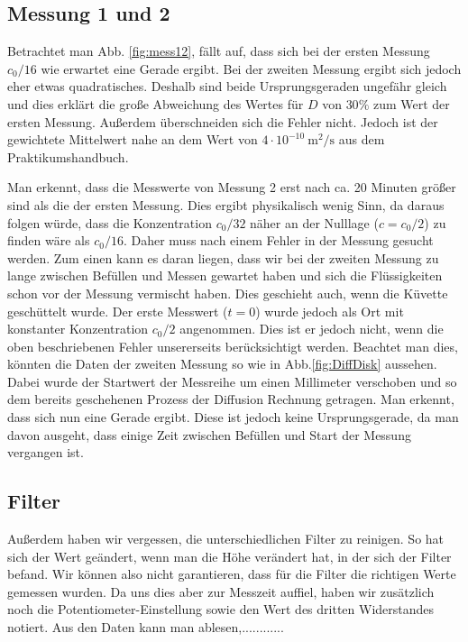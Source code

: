 \documentclass[12pt,a4paper,titlepage,headinclude,bibtotoc]{scrartcl}
\begin{document}
\subsection{Messung 1 und 2}
Betrachtet man Abb. \ref{fig:mess12}, fällt auf, dass sich bei der ersten Messung $c_0/16$ wie erwartet eine Gerade ergibt. Bei der zweiten Messung ergibt sich jedoch eher etwas quadratisches.
Deshalb sind beide Ursprungsgeraden ungefähr gleich und dies erklärt die große Abweichung des Wertes für $D$ von $30\%$ zum Wert der ersten Messung.
Außerdem überschneiden sich die Fehler nicht.
Jedoch ist der gewichtete Mittelwert nahe an dem Wert von $4\cdot 10^{-10}~\si{\meter^2/\second}$ aus dem Praktikumshandbuch.

Man erkennt, dass die Messwerte von Messung 2  erst nach ca. 20 Minuten größer sind als die der ersten Messung.
Dies ergibt physikalisch wenig Sinn, da daraus folgen würde, dass die Konzentration $c_0/32$ näher an der Nulllage ($c=c_0/2$) zu finden wäre als $c_0/16$. 
Daher muss nach einem Fehler in der Messung gesucht werden.
Zum einen kann es daran liegen, dass wir bei der zweiten Messung zu lange zwischen Befüllen und Messen gewartet haben und sich die Flüssigkeiten schon vor der Messung vermischt haben.
Dies geschieht auch, wenn die Küvette geschüttelt wurde.
Der erste Messwert ($t=0$) wurde jedoch als Ort mit konstanter Konzentration $c_0/2$ angenommen.
Dies ist er jedoch nicht, wenn die oben beschriebenen Fehler unsererseits berücksichtigt werden.
Beachtet man dies, könnten die Daten der zweiten Messung so wie in Abb.\ref{fig:DiffDisk} aussehen.
Dabei wurde der Startwert der Messreihe um einen Millimeter verschoben und so dem bereits geschehenen Prozess der Diffusion Rechnung getragen.
Man erkennt, dass sich nun eine Gerade ergibt. Diese ist jedoch keine Ursprungsgerade, da man davon ausgeht, dass einige Zeit zwischen Befüllen und Start der Messung vergangen ist.

\subsection{Filter}
Außerdem haben wir vergessen, die unterschiedlichen Filter zu reinigen.
So hat sich der Wert geändert, wenn man die Höhe verändert hat, in der sich der Filter befand.
Wir können also nicht garantieren, dass für die Filter die richtigen Werte gemessen wurden.
Da uns dies aber zur Messzeit auffiel, haben wir zusätzlich noch die Potentiometer-Einstellung sowie den Wert des dritten Widerstandes notiert.
Aus den Daten kann man ablesen,............
\end{document}
